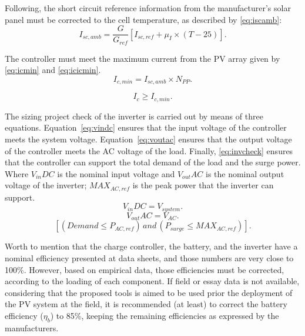 \documentclass[review]{elsarticle}
\begin{document}
Following, the short circuit reference information from the manufacturer's solar panel must be corrected to the cell temperature, as described by \eqref{eq:iscamb}:
%
\begin{equation}
\label{eq:iscamb}
I_{sc,amb} = \dfrac{G}{G_{ref}} \left[ I_{sc,ref} + \mu_{I} \times (T-25) \right]. 
\end{equation}

The controller must meet the maximum current from the PV array given by \eqref{eq:icmin} and \eqref{eq:icicmin}.
\begin{equation}
\label{eq:icmin}
I_{c,min} = I_{sc,amb} \times N_{PP}.
\end{equation}

\begin{equation}
\label{eq:icicmin}
I_{c} \geq I_{c,min}.
\end{equation}

The sizing project check of the inverter is carried out by means of three equations. Equation~\eqref{eq:vindc} ensures that the input voltage of the controller meets the system voltage. Equation~\eqref{eq:voutac} ensures that the output voltage of the controller meets the AC voltage of the load. Finally, \eqref{eq:invcheck} ensures that the controller can support the total demand of the load and the surge power. Where $V_{in}DC$ is the nominal input voltage and $V_{out}AC$ is the nominal output voltage of the inverter; $MAX_{AC,ref}$ is the peak power that the inverter can support.
%
\begin{equation}
\label{eq:vindc} 
V_{in}DC = V_{system}.
\end{equation}
%
\begin{equation}
\label{eq:voutac} 
V_{out}AC = V_{AC}.
\end{equation}
%
\begin{equation}
\label{eq:invcheck} 
\left[ (Demand \leq P_{AC,ref}) \, and \, (P_{surge} \leq MAX_{AC,ref}) \right].
\end{equation}

Worth to mention that the charge controller, the battery, and the inverter have a nominal efficiency presented at data sheets, and those numbers are very close to 100\%. However, based on empirical data, those efficiencies must be corrected, according to the loading of each component. If field or essay data is not available, considering that the proposed tools is aimed to be used prior the deployment of the PV system at the field, it is recommended (at least) to correct the battery efficiency ($\eta_{b}$) to 85\%, keeping the remaining efficiencies as expressed by the manufacturers.
%
\end{document}

